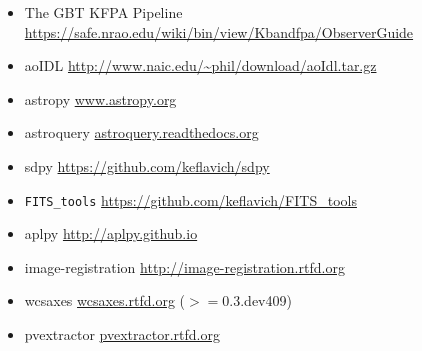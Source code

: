 \begin{itemize}
    \item The GBT KFPA Pipeline \url{https://safe.nrao.edu/wiki/bin/view/Kbandfpa/ObserverGuide}
    \item aoIDL \url{http://www.naic.edu/~phil/download/aoIdl.tar.gz}
    \item astropy \url{www.astropy.org}
    \item astroquery \url{astroquery.readthedocs.org}
    \item sdpy \url{https://github.com/keflavich/sdpy}
    \item \texttt{FITS\_tools} \url{https://github.com/keflavich/FITS_tools}
    \item aplpy \url{http://aplpy.github.io}
    \item image-registration \url{http://image-registration.rtfd.org}
    \item wcsaxes \url{wcsaxes.rtfd.org} ($>=$0.3.dev409)
    \item pvextractor \url{pvextractor.rtfd.org}
\end{itemize}

%
%



